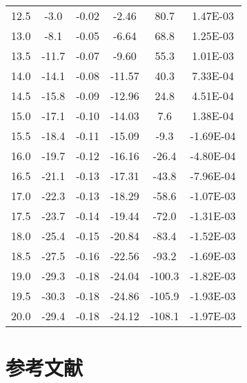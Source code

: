 \documentclass[11pt,a4j]{jsarticle}
\begin{document}
\begin{table}[htb]
\begin{center}
\begin{tabular}{cccccc}
12.5 	&	-3.0 	&	-0.02	&	-2.46		&	80.7 	&	1.47E-03	\\
13.0 	&	-8.1 	&	-0.05	&	-6.64		&	68.8 	&	1.25E-03	\\
13.5 	&	-11.7 	&	-0.07	&	-9.60		&	55.3 	&	1.01E-03	\\
14.0 	&	-14.1 	&	-0.08	&	-11.57		&	40.3 	&	7.33E-04	\\
14.5 	&	-15.8 	&	-0.09	&	-12.96		&	24.8 	&	4.51E-04	\\
15.0 	&	-17.1 	&	-0.10	&	-14.03		&	7.6 	&	1.38E-04	\\
15.5 	&	-18.4 	&	-0.11	&	-15.09		&	-9.3 	&	-1.69E-04	\\
16.0 	&	-19.7 	&	-0.12	&	-16.16		&	-26.4 	&	-4.80E-04	\\
16.5 	&	-21.1 	&	-0.13	&	-17.31		&	-43.8 	&	-7.96E-04	\\
17.0 	&	-22.3 	&	-0.13	&	-18.29		&	-58.6 	&	-1.07E-03	\\
17.5 	&	-23.7 	&	-0.14	&	-19.44		&	-72.0 	&	-1.31E-03	\\
18.0 	&	-25.4 	&	-0.15	&	-20.84		&	-83.4 	&	-1.52E-03	\\
18.5 	&	-27.5 	&	-0.16	&	-22.56		&	-93.2 	&	-1.69E-03	\\
19.0 	&	-29.3 	&	-0.18	&	-24.04		&	-100.3 	&	-1.82E-03	\\
19.5 	&	-30.3 	&	-0.18	&	-24.86		&	-105.9 	&	-1.93E-03	\\
20.0 	&	-29.4 	&	-0.18	&	-24.12		&	-108.1 	&	-1.97E-03	\\ \bottomrule
    \end{tabular}
    \label{tab:price}
  \end{center}
\end{table}
  
 \section{参考文献}
  
  
  
\end{document}

